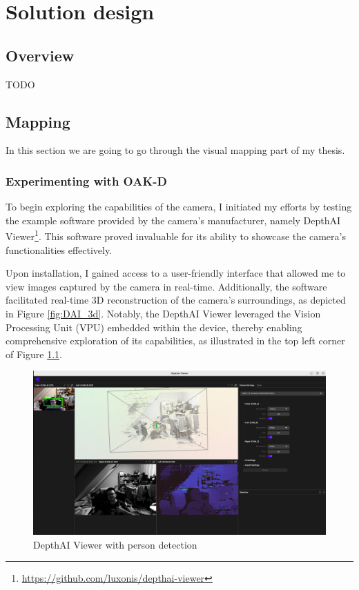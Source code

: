 \chapter{Solution design}

\section{Overview}

TODO

\section{Mapping}

In this section we are going to go through the visual mapping part of my thesis.

\subsection{Experimenting with OAK-D}

To begin exploring the capabilities of the camera, I initiated my efforts by testing the example software provided by the camera's manufacturer, namely DepthAI Viewer\footnote{\url{https://github.com/luxonis/depthai-viewer}}. This software proved invaluable for its ability to showcase the camera's functionalities effectively.

Upon installation, I gained access to a user-friendly interface that allowed me to view images captured by the camera in real-time. Additionally, the software facilitated real-time 3D reconstruction of the camera's surroundings, as depicted in Figure \ref{fig:DAI_3d}. Notably, the DepthAI Viewer leveraged the Vision Processing Unit (VPU) embedded within the device, thereby enabling comprehensive exploration of its capabilities, as illustrated in the top left corner of Figure \ref{fig:DAI_person_detection}.

\begin{figure}[H]
	\centering
	\includegraphics[width=150mm, keepaspectratio]{figures/depthai_viewer.png}
	\caption{DepthAI Viewer with person detection}
	\label{fig:DAI_person_detection}
\end{figure}

